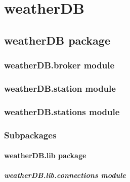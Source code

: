 \documentclass[letterpaper,10pt,english]{sphinxmanual}
\begin{document}
\chapter{weatherDB}
\label{\detokenize{modules:weatherdb}}\label{\detokenize{modules::doc}}

\section{weatherDB package}
\label{\detokenize{weatherDB:weatherdb-package}}\label{\detokenize{weatherDB::doc}}

\subsection{weatherDB.broker module}
\label{\detokenize{weatherDB:weatherdb-broker-module}}

\subsection{weatherDB.station module}
\label{\detokenize{weatherDB:weatherdb-station-module}}

\subsection{weatherDB.stations module}
\label{\detokenize{weatherDB:weatherdb-stations-module}}

\subsection{Subpackages}
\label{\detokenize{weatherDB:subpackages}}

\subsubsection{weatherDB.lib package}
\label{\detokenize{weatherDB.lib:weatherdb-lib-package}}\label{\detokenize{weatherDB.lib::doc}}

\paragraph{weatherDB.lib.connections module}
\label{\detokenize{weatherDB.lib:module-weatherDB.lib.connections}}\label{\detokenize{weatherDB.lib:weatherdb-lib-connections-module}}
\end{document}
